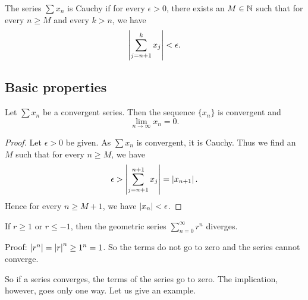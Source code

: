 \begin{prop} \label{prop:cachyser}
The series $\sum x_n$ is Cauchy if for every $\epsilon > 0$, 
there exists an $M \in {\mathbb{N}}$ such that for every $n \geq M$
and every $k > n$, we have
\begin{equation*}
\left\lvert { \sum_{j={n+1}}^k x_j } \right\rvert
< \epsilon .
\end{equation*}
\end{prop}

\subsection{Basic properties}

\begin{prop}
Let $\sum x_n$ be a convergent series.  Then
the sequence $\{ x_n \}$ is convergent and
\begin{equation*}
\lim_{n\to\infty} x_n = 0.
\end{equation*}
\end{prop}

\begin{proof}
Let $\epsilon > 0$ be given.  As $\sum x_n$ is convergent, it is Cauchy.
Thus we find an $M$ such that for every $n \geq M$, we have
\begin{equation*}
\epsilon > 
\left\lvert { \sum_{j={n+1}}^{n+1} x_j } \right\rvert
=
\left\lvert { x_{n+1} } \right\rvert .
\end{equation*}
Hence for every $n \geq M+1$, we have $\left\lvert {x_{n}} \right\rvert < \epsilon$.
\end{proof}

\begin{example}
If $r \geq 1$ or $r \leq -1$, then the geometric series $\sum_{n=0}^\infty r^n$
diverges.

Proof: $\left\lvert {r^n} \right\rvert = \left\lvert {r} \right\rvert^n \geq 1^n = 1$.  So the terms do not go to zero
and the series cannot converge.
\end{example}

So if a series converges, the terms of the series go to zero.
The implication, however, goes only one way.
Let us give an example.

